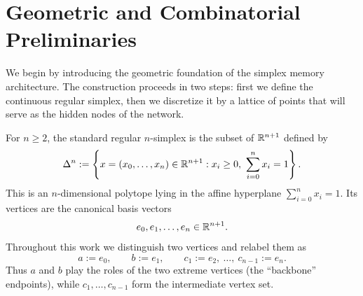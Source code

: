 \section{Geometric and Combinatorial Preliminaries}
\label{sec:preliminaries}

We begin by introducing the geometric foundation of the simplex memory architecture. The construction proceeds in two steps: first we define the continuous regular simplex, then we discretize it by a lattice of points that will serve as the hidden nodes of the network.

\begin{definition}
For $n\geq 2$, the standard regular $n$-simplex is the subset of $\mathbb{R}^{n+1}$ defined by
\[
\Delta^n
:=
\left\{x=(x_0,\dots,x_n)\in \mathbb{R}^{n+1}: x_i\geq 0,\ \sum_{i=0}^n x_i=1\right\}.
\]
This is an $n$-dimensional polytope lying in the affine hyperplane $\sum_{i=0}^n x_i=1$. Its vertices are the canonical basis vectors
\[
e_0, e_1, \dots, e_n \in \mathbb{R}^{n+1}.
\]
Throughout this work we distinguish two vertices and relabel them as
\[
a := e_0,
\qquad
b := e_1,
\qquad
c_1 := e_2,\ \dots,\ c_{n-1}:=e_n.
\]
Thus $a$ and $b$ play the roles of the two extreme vertices (the ``backbone'' endpoints), while $c_1,\dots,c_{n-1}$ form the intermediate vertex set.
\end{definition}

